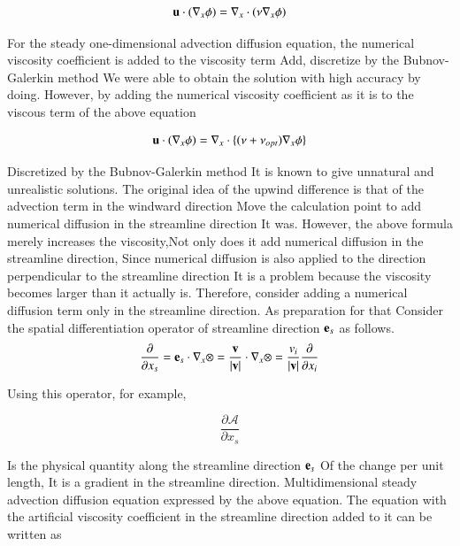 \begin{equation}
 {\mathbf{u}}\cdot(\nabla_x\phi) = \nabla_x \cdot (\nu\nabla_x\phi)
\end{equation}

For the steady one-dimensional advection diffusion equation, the numerical viscosity coefficient is added to the viscosity term
Add, discretize by the Bubnov-Galerkin method
We were able to obtain the solution with high accuracy by doing.
However, by adding the numerical viscosity coefficient as it is to the viscous term of the above equation

\begin{equation}
{\mathbf{u}}\cdot(\nabla_x\phi) = \nabla_x \cdot \{(\nu+\nu_{opt})\nabla_x\phi\}
\end{equation}

Discretized by the Bubnov-Galerkin method
It is known to give unnatural and unrealistic solutions.
%
The original idea of ​​the upwind difference is that of the advection term in the windward direction Move the calculation point to add numerical diffusion in the streamline direction It was.
%
However, the above formula merely increases the viscosity,Not only does it add numerical diffusion in the streamline direction, Since numerical diffusion is also applied to the direction perpendicular to the streamline direction
It is a problem because the viscosity becomes larger than it actually is.
Therefore, consider adding a numerical diffusion term only in the streamline direction.
%
As preparation for that Consider the spatial differentiation operator of streamline direction $\mathbf{e}_s$ as follows.
%
\begin{equation}
\frac{\partial}{\partial x_s} = {\mathbf{e}_s} \cdot \nabla_x \otimes = \frac{\mathbf{v}}{|{\mathbf{v}}|} \cdot \nabla_x \otimes = \frac{v_i}{|{\mathbf{v}}|} \frac{\partial}{\partial x_i}
\end{equation}

Using this operator, for example,

\begin{equation}
\frac{\partial \mathcal{A}}{\partial x_s}
\end{equation}

Is the physical quantity along the streamline direction $\mathbf{e}_s$  Of the change per unit length, It is a gradient in the streamline direction.
%
Multidimensional steady advection diffusion equation expressed by the above equation.
%
The equation with the artificial viscosity coefficient in the streamline direction added to it can be written as

